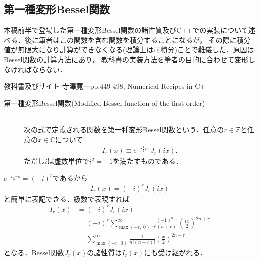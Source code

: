 \documentclass[a4j,papersize,disablejfam,slide,14pt]{jsarticle}
\def\max#1#2{\operatorname{max} \left\{ #1,\ #2 \right\}} %
\def\exp#1{e^{#1}} %
\begin{document}
\subsection{第一種変形{\rm Bessel}関数}
\label{sec:appendix_bessel_property}
	本稿前半で登場した第一種変形{\rm Bessel}関数の諸性質及び{\rm C++}での実装について述べる．後に筆者はこの関数を含む関数を積分することになるが，
    その際に積分値が無限大になり計算ができなくなる(理論上は可積分)ことで難儀した．原因は{\rm Bessel}関数の計算方法にあり，
    教科書の実装方法を筆者の目的に合わせて変形しなければならない．
    \begin{itembox}[l]{教科書及びサイト}
    	{\rm 寺澤寛一\cite{terakan}pp.449-498, Numerical Recipes in C++\cite{numerical_cpp}}
    \end{itembox}
    \begin{screen}
    	\begin{description}
        	\item[第一種変形{\rm Bessel}関数({\rm Modified Bessel function of the first order})]\mbox{}\\
            次の式で定義される関数を第一種変形{\rm Bessel}関数という．任意の$r\in \mathbb{Z}$と任意の$x \in \mathbb{C}$について
            \begin{align}
            	I_r(x) \equiv \exp{-i\frac{1}{2}r \pi} J_r(ix). \label{eq:bessel_modified_bessel}
            \end{align}
            ただし$i$は虚数単位で$i^2=-1$を満たすものである．
        \end{description}
    \end{screen}
    $\exp{-i\frac{1}{2}r \pi}=(-i)^r$であるから
    \begin{align}
    	I_r(x) = (-i)^r J_r(ix)
    \end{align}
    と簡単に表記できる．級数で表現すれば
    \begin{align}
    	I_r(x) &= (-i)^r J_r(ix) \\
        &= (-i)^r \sum_{\max{-r}{0}}^{\infty} \frac{(-1)^n}{n!(n+r)!} \left( \frac{ix}{2} \right)^{2n+r} \\
        &= \sum_{\max{-r}{0}}^{\infty} \frac{1}{n!(n+r)!} \left( \frac{x}{2} \right)^{2n+r}
    \end{align}
    となる．{\rm Bessel}関数$J_r(x)$の諸性質は$I_r(x)$にも受け継がれる．
\end{document}
